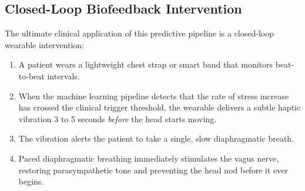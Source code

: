 \documentclass[12pt,a4paper,oneside]{report}
\begin{document}
\subsection{Closed-Loop Biofeedback Intervention}
The ultimate clinical application of this predictive pipeline is a closed-loop wearable intervention:
\begin{enumerate}[leftmargin=1.5cm, label=\textbf{\arabic*.}]
    \item A patient wears a lightweight chest strap or smart band that monitors beat-to-beat intervals.
    \item When the machine learning pipeline detects that the rate of stress increase has crossed the clinical trigger threshold, the wearable delivers a subtle haptic vibration 3 to 5 seconds \textit{before} the head starts moving.
    \item The vibration alerts the patient to take a single, slow diaphragmatic breath.
    \item Paced diaphragmatic breathing immediately stimulates the vagus nerve, restoring parasympathetic tone and preventing the head nod before it ever begins.
\end{enumerate}
\end{document}
